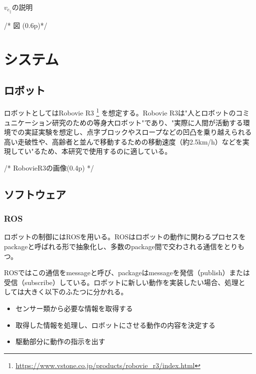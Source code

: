 \documentclass{kuthesis}
\begin{document}
$v_e_{\parallel}$の説明


%

/* 図 (0.6p)*/

\section{システム}

\subsection{ロボット}

ロボットとしてはRobovie R3 \footnote{\url{https://www.vstone.co.jp/products/robovie_r3/index.html}} を想定する。Robovie R3は"人とロボットのコミュニケーション研究のための等身大ロボット"であり、"実際に人間が活動する環境での実証実験を想定し、点字ブロックやスロープなどの凹凸を乗り越えられる高い走破性や、高齢者と並んで移動するための移動速度（約2.5km/h）などを実現してい"るため、本研究で使用するのに適している。

/* RobovieR3の画像(0.4p) */

\subsection{ソフトウェア}
\subsubsection{ROS}
ロボットの制御にはROSを用いる。ROSはロボットの動作に関わるプロセスをpackageと呼ばれる形で抽象化し、多数のpackage間で交わされる通信をとりもつ。

ROSではこの通信をmessageと呼び、packageはmessageを発信（publish）または受信（subscribe）している。ロボットに新しい動作を実装したい場合、処理としては大きく以下のふたつに分かれる。
\begin{itemize}
	\item センサー類から必要な情報を取得する
	\item 取得した情報を処理し、ロボットにさせる動作の内容を決定する
	\item 駆動部分に動作の指示を出す
\end{itemize}
\end{document}
